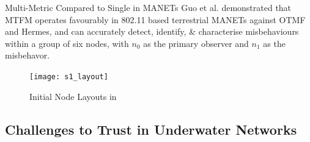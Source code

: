 \documentclass{beamer}
\begin{document}
\begin{frame}{Multi-Metric Compared to Single in MANETs}
  Guo et al.\cite{Guo11} demonstrated that MTFM operates favourably in 802.11 based terrestrial MANETs against OTMF and Hermes, and can accurately detect, identify, \& characterise misbehaviours within a group of six nodes, with $n_0$ as the primary observer and $n_1$ as the misbehavor.

  \begin{figure}[h]
    \begin{center}
      \texttt{[image: s1\_layout]}
    \end{center}
    \caption{Initial Node Layouts in \cite{Guo11}}
    \label{fig:node_layout}
  \end{figure}
  \end{frame}

\subsection{Challenges to Trust in Underwater Networks}
\end{document}
